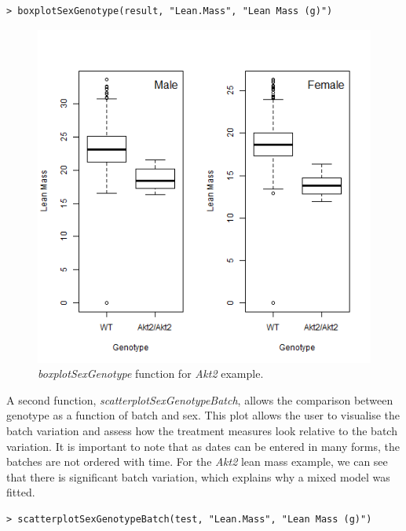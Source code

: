 \documentclass[12pt,a4paper]{article}
\begin{document}
\begingroup
    \fontsize{8pt}{12pt}\selectfont
\begin{verbatim}
> boxplotSexGenotype(result, "Lean.Mass", "Lean Mass (g)")
\end{verbatim}
\endgroup 

\begin{figure}[H]%
\centerline{\includegraphics[scale=0.5]{cs1_boxplotSexGenotype.png}}
\caption{\textit{boxplotSexGenotype} function for \textit{Akt2} example.}\label{fig:15}
\end{figure}

A second function, \textit{scatterplotSexGenotypeBatch}, allows the comparison between genotype as a function of batch and sex.  
This plot allows the user to visualise the batch variation and assess how the treatment measures look relative to the batch variation. 
It is important to note that as dates can be entered in many forms, the batches are not ordered with time. 
For the \textit{Akt2} lean mass example, we can see that there is significant batch variation, which explains why a mixed model was fitted.

\begingroup
    \fontsize{8pt}{12pt}\selectfont
\begin{verbatim}
> scatterplotSexGenotypeBatch(test, "Lean.Mass", "Lean Mass (g)")
\end{verbatim}
\endgroup 
\end{document}
